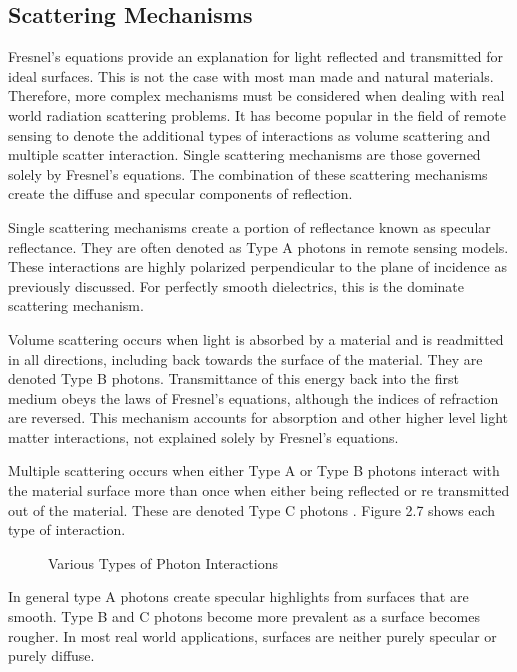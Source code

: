 \subsection{Scattering Mechanisms}

Fresnel’s equations provide an explanation for light reflected and transmitted for ideal surfaces.  This is not the case with most man made and natural materials.  Therefore, more complex mechanisms must be considered when dealing with real world radiation scattering problems.  It has become popular in the field of remote sensing to denote the additional types of interactions as volume scattering and multiple scatter interaction.  Single scattering mechanisms are those governed solely by Fresnel’s equations.  The combination of these scattering mechanisms create the diffuse and specular components of reflection.

Single scattering mechanisms create a portion of reflectance known as specular reflectance.  They are often denoted as Type A photons in remote sensing models.  These interactions are highly polarized perpendicular to the plane of incidence as previously discussed. For perfectly smooth dielectrics, this is the dominate scattering mechanism.

Volume scattering occurs when light is absorbed by a material and is readmitted in all directions, including back towards the surface of the material.  They are denoted Type B photons.  Transmittance of this energy back into the first medium obeys the laws of Fresnel’s equations, although the indices of refraction are reversed.  This mechanism accounts for absorption and other higher level light matter interactions, not explained solely by Fresnel’s equations.

Multiple scattering occurs when either Type A or Type B photons interact with the material surface more than once when either being reflected or re transmitted out of the material.  These are denoted Type C photons \cite{schott}.  Figure 2.7 shows each type of interaction.
%
\begin{figure}
    \begin{center}
    \end{center}
    \caption{Various Types of Photon Interactions}
    \label{fig:scattering}
\end{figure}
%
In general type A photons create specular highlights from surfaces that are smooth.  Type B and C photons become more prevalent as a surface becomes rougher.  In most real world applications, surfaces are neither purely specular or purely diffuse.

